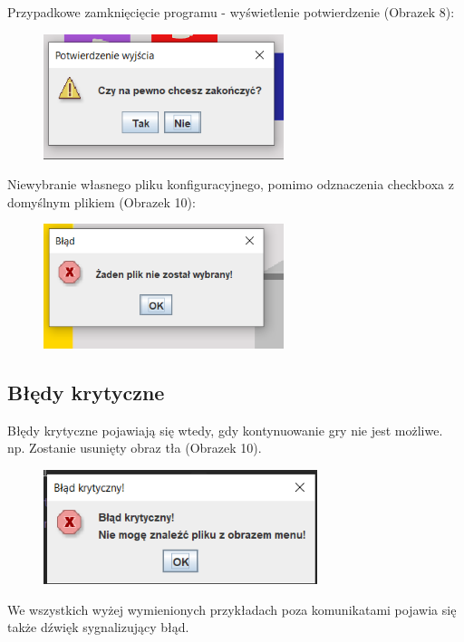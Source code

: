\documentclass{article}
\begin{document}
Przypadkowe zamknięcięcie programu - wyświetlenie potwierdzenie (Obrazek 8):
\begin{figure} [hbt!]
    \centering
    \includegraphics[width=7cm]{blad_4.png}
\end{figure}
\newline
{}

Niewybranie własnego pliku konfiguracyjnego, pomimo odznaczenia checkboxa z domyślnym plikiem (Obrazek 10):

\begin{figure} [hbt!]
    \centering
    \includegraphics[width=7cm]{blad_5.png}
\end{figure}


\subsection{Błędy krytyczne}
Błędy krytyczne pojawiają się wtedy, gdy kontynuowanie gry nie jest możliwe.
np. Zostanie usunięty obraz tła (Obrazek 10).

\begin{figure} [hbt!]
    \centering
    \includegraphics[width=8cm]{krytyczny.png}
\end{figure}

We wszystkich wyżej wymienionych przykładach poza komunikatami pojawia się także dźwięk sygnalizujący błąd.
\end{document}
